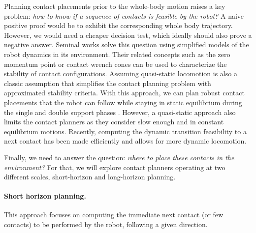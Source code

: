 Planning contact placements prior to the whole-body motion raises a key problem: \textit{how to know if a sequence of contacts is feasible by the robot?}
A naive positive proof would be to exhibit the corresponding whole body trajectory. However, we would need a cheaper decision test, which ideally should also prove a negative answer.
Seminal works solve this question using simplified models of the robot dynamics in its environment. Their related concepts such as the zero momentum point \cite{kajita2003ZMP} or contact wrench cones \cite{trinkle_2002_cwc} can be used to characterize the stability of contact configurations. 
Assuming quasi-static locomotion is also a classic assumption that simplifies the contact planning problem with approximated stability criteria. With this approach, we can plan robust contact placements that the robot can follow while staying in static equilibrium during the single and double support phases \cite{prete_static_equilibrium_2016}.
However, a quasi-static approach also limits the contact planners as they consider slow enough and in constant equilibrium motions. %
Recently, computing the dynamic transition feasibility to a next contact has been made efficiently \cite{CROC} and allows for more dynamic locomotion. %

Finally, we need to answer the question: \textit{where to place these contacts in the environment?}
For that, we will explore contact planners operating at two different scales, short-horizon and long-horizon planning.

\paragraph{Short horizon planning.}
This approach focuses on computing the immediate next contact (or few contacts) to be performed by the robot, following a given direction.

